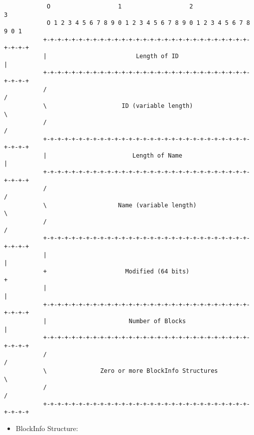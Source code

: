 \begin{verbatim}
            O                   1                   2                   3
            O 1 2 3 4 5 6 7 8 9 0 1 2 3 4 5 6 7 8 9 0 1 2 3 4 5 6 7 8 9 0 1
           +-+-+-+-+-+-+-+-+-+-+-+-+-+-+-+-+-+-+-+-+-+-+-+-+-+-+-+-+-+-+-+-+
           |                         Length of ID                          |
           +-+-+-+-+-+-+-+-+-+-+-+-+-+-+-+-+-+-+-+-+-+-+-+-+-+-+-+-+-+-+-+-+
           /                                                               /
           \                     ID (variable length)                      \
           /                                                               /
           +-+-+-+-+-+-+-+-+-+-+-+-+-+-+-+-+-+-+-+-+-+-+-+-+-+-+-+-+-+-+-+-+
           |                        Length of Name                         |
           +-+-+-+-+-+-+-+-+-+-+-+-+-+-+-+-+-+-+-+-+-+-+-+-+-+-+-+-+-+-+-+-+
           /                                                               /
           \                    Name (variable length)                     \
           /                                                               /
           +-+-+-+-+-+-+-+-+-+-+-+-+-+-+-+-+-+-+-+-+-+-+-+-+-+-+-+-+-+-+-+-+
           |                                                               |
           +                      Modified (64 bits)                       +
           |                                                               |
           +-+-+-+-+-+-+-+-+-+-+-+-+-+-+-+-+-+-+-+-+-+-+-+-+-+-+-+-+-+-+-+-+
           |                       Number of Blocks                        |
           +-+-+-+-+-+-+-+-+-+-+-+-+-+-+-+-+-+-+-+-+-+-+-+-+-+-+-+-+-+-+-+-+
           /                                                               /
           \               Zero or more BlockInfo Structures               \
           /                                                               /
           +-+-+-+-+-+-+-+-+-+-+-+-+-+-+-+-+-+-+-+-+-+-+-+-+-+-+-+-+-+-+-+-+
\end{verbatim}

\begin{itemize}
 \item BlockInfo Structure:
\end{itemize}

